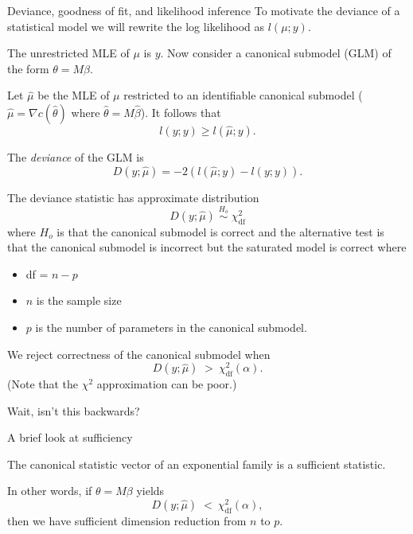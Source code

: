 \documentclass[
  ignorenonframetext,
]{beamer}
\providecommand{\tightlist}{%
  \setlength{\itemsep}{0pt}\setlength{\parskip}{0pt}}
\begin{document}
\begin{frame}{Deviance, goodness of fit, and likelihood inference}
\protect\hypertarget{deviance-goodness-of-fit-and-likelihood-inference}{}
To motivate the deviance of a statistical model we will rewrite the log
likelihood as \(l(\mu;y)\).

The unrestricted MLE of \(\mu\) is \(y\). Now consider a canonical
submodel (GLM) of the form \(\theta = M\beta\).

Let \(\hat\mu\) be the MLE of \(\mu\) restricted to an identifiable
canonical submodel (\(\hat{\mu} = \nabla c(\hat\theta)\) where
\(\hat\theta = M\hat\beta\)). It follows that \[
  l(y;y) \geq l(\hat\mu; y).
\]

The \emph{deviance} of the GLM is \[
  D(y;\hat\mu) = -2\left(l(\hat\mu;y) - l(y;y)\right).
\]
\end{frame}

\begin{frame}{}
\protect\hypertarget{section-9}{}
The deviance statistic has approximate distribution \[
  D(y;\hat\mu) \; \overset{H_o}{\sim} \; \chi^2_{\text{df}}
\] where \(H_o\) is that the canonical submodel is correct and the
alternative test is that the canonical submodel is incorrect but the
saturated model is correct where

\begin{itemize}
\tightlist
\item
  df = \(n - p\)
\item
  \(n\) is the sample size
\item
  \(p\) is the number of parameters in the canonical submodel.
\end{itemize}
\end{frame}

\begin{frame}{}
\protect\hypertarget{section-10}{}
We reject correctness of the canonical submodel when \[
  D(y;\hat\mu) \; > \: \chi^2_{\text{df}}(\alpha).
\] (Note that the \(\chi^2\) approximation can be poor.)

\vspace{12pt}

Wait, isn't this backwards?
\end{frame}

\begin{frame}{A brief look at sufficiency}
\protect\hypertarget{a-brief-look-at-sufficiency}{}
\begin{lem}
The canonical statistic vector of an exponential family is a sufficient statistic.
\end{lem}

\vspace{12pt}

In other words, if \(\theta = M\beta\) yields \[
  D(y;\hat\mu) \; < \: \chi^2_{\text{df}}(\alpha),
\] then we have sufficient dimension reduction from \(n\) to \(p\).
\end{frame}
\end{document}
